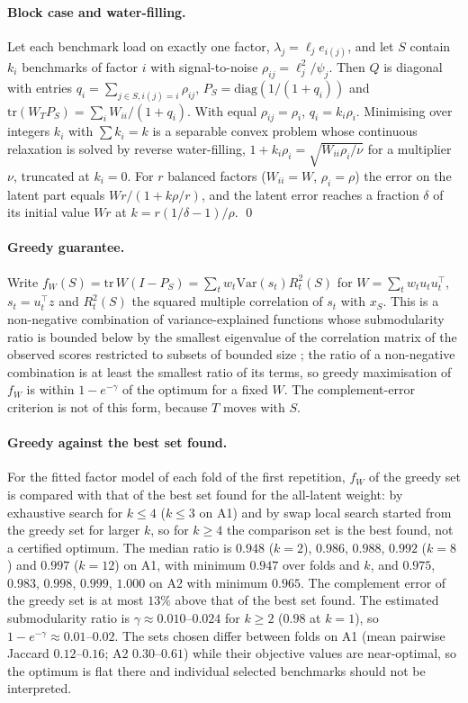 \paragraph{Block case and water-filling.}
Let each benchmark load on exactly one factor, $\lambda_j=\ell_j e_{i(j)}$, and let $S$ contain $k_i$ benchmarks of factor $i$ with signal-to-noise $\rho_{ij}=\ell_j^2/\psi_j$. Then $Q$ is diagonal with entries $q_i=\sum_{j\in S,i(j)=i}\rho_{ij}$, $P_S=\mathrm{diag}(1/(1+q_i))$ and $\mathrm{tr}(W_TP_S)=\sum_iW_{ii}/(1+q_i)$. With equal $\rho_{ij}=\rho_i$, $q_i=k_i\rho_i$. Minimising over integers $k_i$ with $\sum k_i=k$ is a separable convex problem whose continuous relaxation is solved by reverse water-filling, $1+k_i\rho_i=\sqrt{W_{ii}\rho_i/\nu}$ for a multiplier $\nu$, truncated at $k_i=0$. For $r$ balanced factors ($W_{ii}=W$, $\rho_i=\rho$) the error on the latent part equals $W r/(1+k\rho/r)$, and the latent error reaches a fraction $\delta$ of its initial value $Wr$ at $k=r(1/\delta-1)/\rho$. \qed

\paragraph{Greedy guarantee.}
\label{app:greedy}
Write $f_W(S)=\mathrm{tr}\,W(I-P_S)=\sum_tw_t\mathrm{Var}(s_t)R^2_t(S)$ for $W=\sum_tw_tu_tu_t^\top$, $s_t=u_t^\top z$ and $R^2_t(S)$ the squared multiple correlation of $s_t$ with $x_S$. This is a non-negative combination of variance-explained functions whose submodularity ratio is bounded below by the smallest eigenvalue of the correlation matrix of the observed scores restricted to subsets of bounded size \citep{das2011submodular}; the ratio of a non-negative combination is at least the smallest ratio of its terms, so greedy maximisation of $f_W$ is within $1-e^{-\gamma}$ of the optimum for a fixed $W$. The complement-error criterion is not of this form, because $T$ moves with $S$.

\paragraph{Greedy against the best set found.}
For the fitted factor model of each fold of the first repetition, $f_W$ of the greedy set is compared with that of the best set found for the all-latent weight: by exhaustive search for $k\le4$ ($k\le3$ on A1) and by swap local search started from the greedy set for larger $k$, so for $k\ge4$ the comparison set is the best found, not a certified optimum. The median ratio is $0.948$ ($k=2$), $0.986$, $0.988$, $0.992$ ($k=8$) and $0.997$ ($k=12$) on A1, with minimum $0.947$ over folds and $k$, and $0.975$, $0.983$, $0.998$, $0.999$, $1.000$ on A2 with minimum $0.965$. The complement error of the greedy set is at most $13\%$ above that of the best set found. The estimated submodularity ratio is $\gamma\approx0.010$--$0.024$ for $k\ge2$ ($0.98$ at $k=1$), so $1-e^{-\gamma}\approx0.01$--$0.02$. The sets chosen differ between folds on A1 (mean pairwise Jaccard $0.12$--$0.16$; A2 $0.30$--$0.61$) while their objective values are near-optimal, so the optimum is flat there and individual selected benchmarks should not be interpreted.

